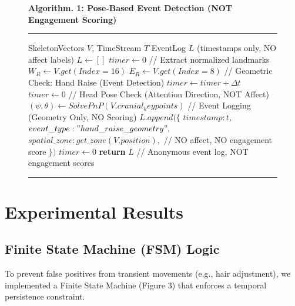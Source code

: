 \documentclass[conference]{IEEEtran}
\newcommand{\RETURN}{\STATE \textbf{return} }
\begin{document}
\begin{figure}[t!]
\centering
\vspace{0.2cm}
\textbf{Algorithm. 1: Pose-Based Event Detection (NOT Engagement Scoring)}
\hrule
\vspace{0.1cm}
\begin{algorithmic}[1]
\small
\REQUIRE SkeletonVectors $V$, TimeStream $T$
\ENSURE EventLog $L$ (timestamps only, NO affect labels)
\STATE $L \leftarrow []$
\STATE $timer \leftarrow 0$
    \STATE // Extract normalized landmarks
    \STATE $W_R \leftarrow V.get(Index=16)$
    \STATE $E_R \leftarrow V.get(Index=8)$
    \STATE // Geometric Check: Hand Raise (Event Detection)
        \STATE $timer \leftarrow timer + \Delta t$
    \ELSE
        \STATE $timer \leftarrow 0$
    \ENDIF
    \STATE // Head Pose Check (Attention Direction, NOT Affect)
    \STATE $(\psi, \theta) \leftarrow SolvePnP(V.cranial_keypoints)$
    \STATE // Event Logging (Geometry Only, NO Scoring)
        \STATE $L.append(\{$
        \STATE \quad $timestamp: t,$
        \STATE \quad $event\_type: "hand\_raise\_geometry",$
        \STATE \quad $spatial\_zone: get\_zone(V.position),$
        \STATE \quad // NO affect, NO engagement score
        \STATE $\})$
        \STATE $timer \leftarrow 0$
    \ENDIF
\ENDFOR
\RETURN $L$ // Anonymous event log, NOT engagement scores
\end{algorithmic}
\hrule
\label{alg:pose}
\end{figure}

\section{Experimental Results}

\subsection{Finite State Machine (FSM) Logic}
To prevent false positives from transient movements (e.g., hair adjustment), we implemented a Finite State Machine (Figure 3) that enforces a temporal persistence constraint.
\end{document}
